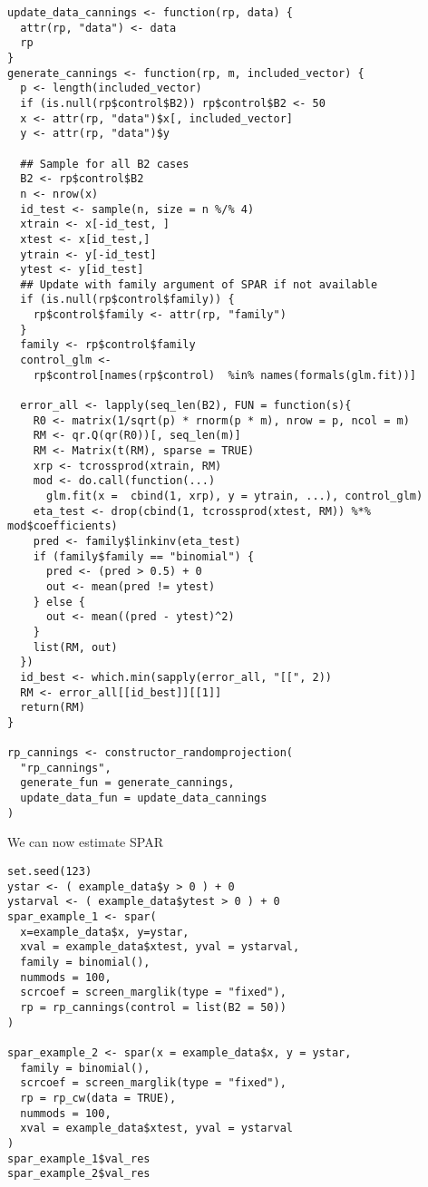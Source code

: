 \documentclass[
  article]{jss}
\begin{document}
\begin{verbatim}
update_data_cannings <- function(rp, data) {
  attr(rp, "data") <- data
  rp
}
generate_cannings <- function(rp, m, included_vector) {
  p <- length(included_vector)
  if (is.null(rp$control$B2)) rp$control$B2 <- 50
  x <- attr(rp, "data")$x[, included_vector]
  y <- attr(rp, "data")$y
  
  ## Sample for all B2 cases 
  B2 <- rp$control$B2
  n <- nrow(x)
  id_test <- sample(n, size = n %/% 4)
  xtrain <- x[-id_test, ]
  xtest <- x[id_test,]
  ytrain <- y[-id_test]
  ytest <- y[id_test]
  ## Update with family argument of SPAR if not available
  if (is.null(rp$control$family)) {
    rp$control$family <- attr(rp, "family")
  }
  family <- rp$control$family
  control_glm <-
    rp$control[names(rp$control)  %in% names(formals(glm.fit))]

  error_all <- lapply(seq_len(B2), FUN = function(s){
    R0 <- matrix(1/sqrt(p) * rnorm(p * m), nrow = p, ncol = m)
    RM <- qr.Q(qr(R0))[, seq_len(m)]
    RM <- Matrix(t(RM), sparse = TRUE)
    xrp <- tcrossprod(xtrain, RM)
    mod <- do.call(function(...) 
      glm.fit(x =  cbind(1, xrp), y = ytrain, ...), control_glm)
    eta_test <- drop(cbind(1, tcrossprod(xtest, RM)) %*% mod$coefficients)
    pred <- family$linkinv(eta_test)
    if (family$family == "binomial") {
      pred <- (pred > 0.5) + 0
      out <- mean(pred != ytest)
    } else {
      out <- mean((pred - ytest)^2)
    }
    list(RM, out)
  })
  id_best <- which.min(sapply(error_all, "[[", 2))
  RM <- error_all[[id_best]][[1]]
  return(RM)
}

rp_cannings <- constructor_randomprojection(
  "rp_cannings",
  generate_fun = generate_cannings,
  update_data_fun = update_data_cannings
)
\end{verbatim}

We can now estimate SPAR

\begin{verbatim}
set.seed(123)      
ystar <- ( example_data$y > 0 ) + 0
ystarval <- ( example_data$ytest > 0 ) + 0
spar_example_1 <- spar(
  x=example_data$x, y=ystar,
  xval = example_data$xtest, yval = ystarval,
  family = binomial(),
  nummods = 100, 
  scrcoef = screen_marglik(type = "fixed"),
  rp = rp_cannings(control = list(B2 = 50))
)

spar_example_2 <- spar(x = example_data$x, y = ystar,
  family = binomial(),
  scrcoef = screen_marglik(type = "fixed"),
  rp = rp_cw(data = TRUE),
  nummods = 100, 
  xval = example_data$xtest, yval = ystarval
)
spar_example_1$val_res
spar_example_2$val_res
\end{verbatim}
\end{document}

